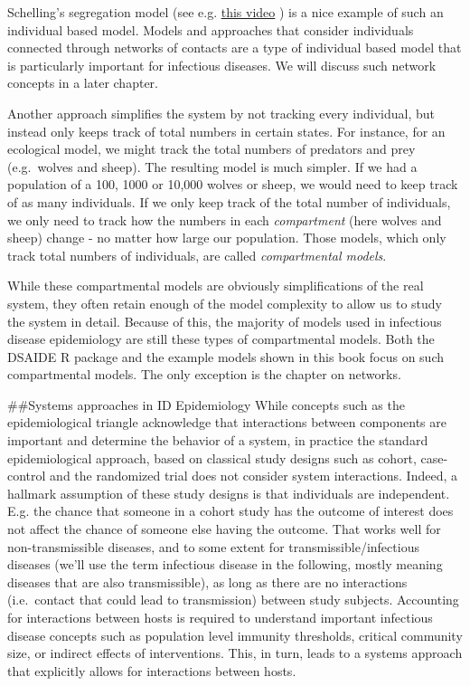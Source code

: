 \documentclass[]{book}
\theoremstyle{definition}
\theoremstyle{definition}
\theoremstyle{definition}
\theoremstyle{remark}
\begin{document}
Schelling's segregation model (see e.g.
\href{https://youtu.be/dFl3Cfw12bo}{this video} ) is a nice example of
such an individual based model. Models and approaches that consider
individuals connected through networks of contacts are a type of
individual based model that is particularly important for infectious
diseases. We will discuss such network concepts in a later chapter.

Another approach simplifies the system by not tracking every individual,
but instead only keeps track of total numbers in certain states. For
instance, for an ecological model, we might track the total numbers of
predators and prey (e.g.~wolves and sheep). The resulting model is much
simpler. If we had a population of a 100, 1000 or 10,000 wolves or
sheep, we would need to keep track of as many individuals. If we only
keep track of the total number of individuals, we only need to track how
the numbers in each \emph{compartment} (here wolves and sheep) change -
no matter how large our population. Those models, which only track total
numbers of individuals, are called \emph{compartmental models}.

While these compartmental models are obviously simplifications of the
real system, they often retain enough of the model complexity to allow
us to study the system in detail. Because of this, the majority of
models used in infectious disease epidemiology are still these types of
compartmental models. Both the DSAIDE R package and the example models
shown in this book focus on such compartmental models. The only
exception is the chapter on networks.

\#\#Systems approaches in ID Epidemiology While concepts such as the
epidemiological triangle acknowledge that interactions between
components are important and determine the behavior of a system, in
practice the standard epidemiological approach, based on classical study
designs such as cohort, case-control and the randomized trial does not
consider system interactions. Indeed, a hallmark assumption of these
study designs is that individuals are independent. E.g. the chance that
someone in a cohort study has the outcome of interest does not affect
the chance of someone else having the outcome. That works well for
non-transmissible diseases, and to some extent for
transmissible/infectious diseases (we'll use the term infectious disease
in the following, mostly meaning diseases that are also transmissible),
as long as there are no interactions (i.e.~contact that could lead to
transmission) between study subjects. Accounting for interactions
between hosts is required to understand important infectious disease
concepts such as population level immunity thresholds, critical
community size, or indirect effects of interventions. This, in turn,
leads to a systems approach that explicitly allows for interactions
between hosts.
\end{document}
